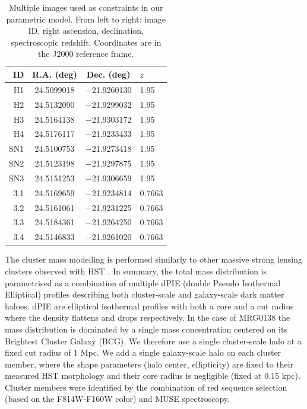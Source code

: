 \documentclass[12pt,dvipsnames]{article}
\begin{document}
\begin{table}[]
    \centering
    \begin{tabular}{rccl}
     ID &   R.A. (deg) & Dec. (deg) & $z$ \\
     \midrule
H1 & 24.5099018 & $-$21.9260130 & 1.95 \\
H2 & 24.5132090 & $-$21.9299032 & 1.95 \\
H3 & 24.5164138 & $-$21.9303172 & 1.95 \\
H4 & 24.5176117 & $-$21.9233433 & 1.95 \\
SN1 & 24.5100753 & $-$21.9273418 & 1.95 \\
SN2 & 24.5123198 & $-$21.9297875 & 1.95 \\
SN3 & 24.5151253 & $-$21.9306659 & 1.95 \\
3.1 & 24.5169659 & $-$21.9234814 & 0.7663 \\
3.2 & 24.5161061 & $-$21.9231225 & 0.7663 \\
3.3 & 24.5184361 & $-$21.9264250 & 0.7663 \\
3.4 & 24.5146833 & $-$21.9261020 & 0.7663 \\
    \end{tabular}
    \caption{Multiple images used as constraints in our parametric model. From left to right: image ID, right ascension, declination, spectroscopic redshift.  Coordinates are in the J2000 reference frame.}
    \label{tab:mulimages}
\end{table}

The cluster mass modelling is performed similarly to other massive strong lensing clusters observed with HST \cite{richard_mass_2014}. In summary, the total mass distribution is parametrised as a combination of multiple dPIE (double Pseudo Isothermal Elliptical) profiles describing both cluster-scale and galaxy-scale dark matter haloes. dPIE are elliptical isothermal profiles with both a core and a cut radius where the density flattens and drops respectively. In the case of MRG0138 the mass distribution is dominated by a single mass concentration centered on its Brightest Cluster Galaxy (BCG). We therefore use a single cluster-scale halo at a fixed cut radius of 1 Mpc.  We add a single galaxy-scale halo on each cluster member, where the shape parameters (halo center, ellipticity) are fixed to their measured HST morphology and their core radius is negligible (fixed at 0.15 kpc). Cluster members were identified by the combination of red sequence selection (based on the F814W-F160W color) and MUSE spectroscopy.
\end{document}
